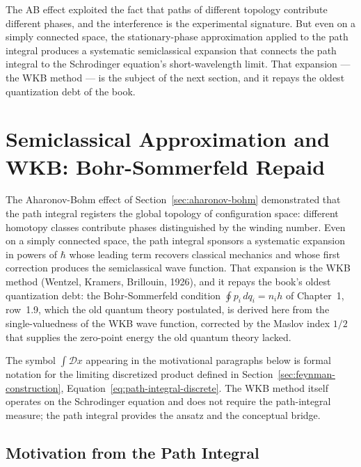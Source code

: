 The AB effect exploited the fact that paths of different topology contribute different phases, and the interference is the experimental signature. But even on a simply connected space, the stationary-phase approximation applied to the path integral produces a systematic semiclassical expansion that connects the path integral to the Schrodinger equation's short-wavelength limit. That expansion --- the WKB method --- is the subject of the next section, and it repays the oldest quantization debt of the book.


\section{Semiclassical Approximation and WKB: Bohr-Sommerfeld Repaid}
\label{sec:wkb}

The Aharonov-Bohm effect of Section~\ref{sec:aharonov-bohm} demonstrated that the path integral registers the global topology of configuration space: different homotopy classes contribute phases distinguished by the winding number. Even on a simply connected space, the path integral sponsors a systematic expansion in powers of $\hbar$ whose leading term recovers classical mechanics and whose first correction produces the semiclassical wave function. That expansion is the WKB method (Wentzel, Kramers, Brillouin, 1926), and it repays the book's oldest quantization debt: the Bohr-Sommerfeld condition $\oint p_i\,dq_i = n_i h$ of Chapter~1, row~1.9, which the old quantum theory postulated, is derived here from the single-valuedness of the WKB wave function, corrected by the Maslov index $1/2$ that supplies the zero-point energy the old quantum theory lacked.

\begin{note}
The symbol $\int\mathcal{D}x$ appearing in the motivational paragraphs below is formal notation for the limiting discretized product defined in Section~\ref{sec:feynman-construction}, Equation~\eqref{eq:path-integral-discrete}. The WKB method itself operates on the Schrodinger equation and does not require the path-integral measure; the path integral provides the ansatz and the conceptual bridge.
\end{note}

\subsection{Motivation from the Path Integral}

